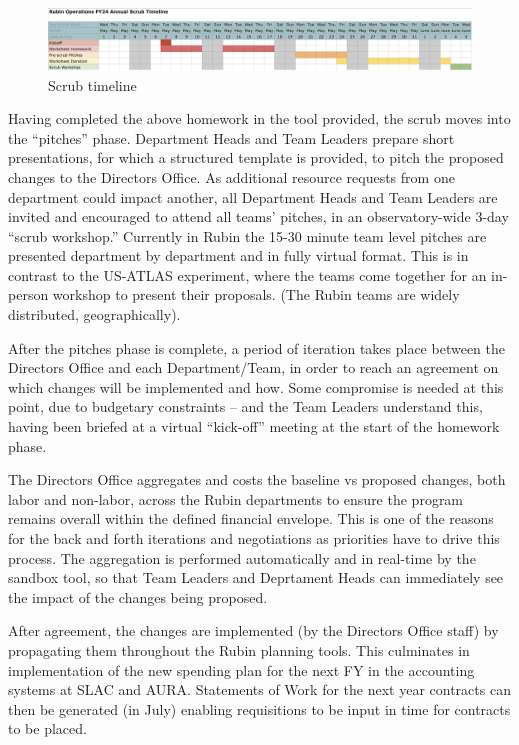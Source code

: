 \begin{figure}[hb!]
\begin{centering}
\includegraphics[width=1.0\textwidth]{Figure1Scrubtimeline}
	\caption{Scrub timeline
\label{fig:timeline}}
\end{centering}
\end{figure}
Having completed the above homework in the tool provided, the scrub moves into the ``pitches'' phase. 
Department Heads and Team Leaders prepare short presentations, for which a structured template is provided, to pitch the proposed changes to the Directors Office. 
As additional resource requests from one department could impact another, all Department Heads and Team Leaders are invited and encouraged to attend all teams' pitches, in an observatory-wide 3-day ``scrub workshop.'' 
Currently in Rubin the 15-30 minute team level pitches are presented department by department and in fully virtual format. 
This is in contrast to the US-ATLAS experiment, where the teams come together for an in-person workshop to present their proposals.
(The Rubin teams are widely distributed, geographically).

After the pitches phase is complete, a period of iteration takes place between the Directors Office and each Department/Team, in order to reach an agreement on which changes will be implemented and how.
Some compromise is needed at this point, due to budgetary constraints -- and the Team Leaders understand this, having been briefed at a virtual ``kick-off'' meeting at the start of the homework phase.

The Directors Office aggregates and costs the baseline vs proposed changes, both labor and non-labor, across the Rubin departments to ensure the program remains overall within the defined financial envelope. 
This is one of the reasons for the back and forth iterations and negotiations as priorities have to drive this process.
The aggregation is performed automatically and in real-time by the sandbox tool, so that Team Leaders and Deprtament Heads can immediately see the impact of the changes being proposed.

After agreement, the changes are implemented (by the Directors Office staff) by propagating them throughout the Rubin planning tools.
This culminates in implementation of the new spending plan for the next FY in the accounting systems at SLAC and AURA. 
Statements of Work for the next year contracts can then be generated (in July) enabling requisitions to be input in time for contracts to be placed.

